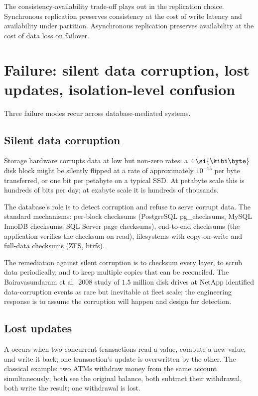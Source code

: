 The consistency-availability trade-off plays out in the replication choice. Synchronous replication preserves consistency at the cost of write latency and availability under partition. Asynchronous replication preserves availability at the cost of data loss on failover.

\section{Failure: silent data corruption, lost updates, isolation-level confusion}

Three failure modes recur across database-mediated systems.

\subsection{Silent data corruption}

Storage hardware corrupts data at low but non-zero rates: a $4\,\si{\kibi\byte}$ disk block might be silently flipped at a rate of approximately $10^{-15}$ per byte transferred, or one bit per petabyte on a typical SSD. At petabyte scale this is hundreds of bits per day; at exabyte scale it is hundreds of thousands.

The database's role is to detect corruption and refuse to serve corrupt data. The standard mechanisms: per-block checksums (PostgreSQL pg\_checksums, MySQL InnoDB checksums, SQL Server page checksums), end-to-end checksums (the application verifies the checksum on read), filesystems with copy-on-write and full-data checksums (ZFS, btrfs).

The remediation against silent corruption is to checksum every layer, to scrub data periodically, and to keep multiple copies that can be reconciled. The Bairavasundaram et al.\ 2008 study of $1.5$ million disk drives at NetApp identified data-corruption events as rare but inevitable at fleet scale; the engineering response is to assume the corruption will happen and design for detection.

\subsection{Lost updates}

A  occurs when two concurrent transactions read a value, compute a new value, and write it back; one transaction's update is overwritten by the other. The classical example: two ATMs withdraw money from the same account simultaneously; both see the original balance, both subtract their withdrawal, both write the result; one withdrawal is lost.

